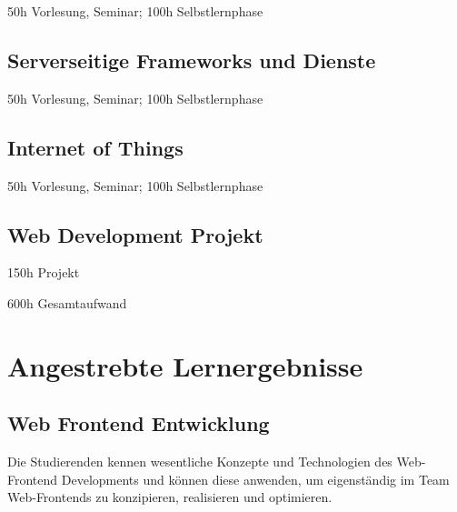 50h Vorlesung, Seminar; 100h Selbstlernphase

\subsection*{Serverseitige Frameworks und
Dienste\label{/mi-2017/modulbeschreibungen-bachelor/BA_Vertiefung-Web_Development}}\label{serverseitige-frameworks-und-dienstepathlabelmi-2017modulbeschreibungen-bachelorbaux5fvertiefung-webux5fdevelopment}

50h Vorlesung, Seminar; 100h Selbstlernphase

\subsection*{Internet of
Things\label{/mi-2017/modulbeschreibungen-bachelor/BA_Vertiefung-Web_Development}}\label{internet-of-thingspathlabelmi-2017modulbeschreibungen-bachelorbaux5fvertiefung-webux5fdevelopment}

50h Vorlesung, Seminar; 100h Selbstlernphase

\subsection*{Web Development
Projekt\label{/mi-2017/modulbeschreibungen-bachelor/BA_Vertiefung-Web_Development}}\label{web-development-projektpathlabelmi-2017modulbeschreibungen-bachelorbaux5fvertiefung-webux5fdevelopment}

150h Projekt

600h Gesamtaufwand

\section*{Angestrebte
Lernergebnisse\label{/mi-2017/modulbeschreibungen-bachelor/BA_Vertiefung-Web_Development}}\label{angestrebte-lernergebnissepathlabelmi-2017modulbeschreibungen-bachelorbaux5fvertiefung-webux5fdevelopment}

\subsection*{Web Frontend
Entwicklung\label{/mi-2017/modulbeschreibungen-bachelor/BA_Vertiefung-Web_Development}}\label{web-frontend-entwicklungpathlabelmi-2017modulbeschreibungen-bachelorbaux5fvertiefung-webux5fdevelopment-1}

Die Studierenden kennen wesentliche Konzepte und Technologien des
Web-Frontend Developments und können diese anwenden, um eigenständig im
Team Web-Frontends zu konzipieren, realisieren und optimieren.

